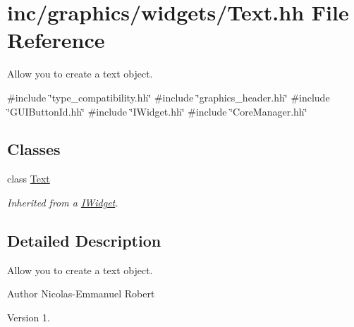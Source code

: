 \hypertarget{Text_8hh}{}\section{inc/graphics/widgets/\+Text.hh File Reference}
\label{Text_8hh}


Allow you to create a text object.  


{\ttfamily \#include \char`\"{}type\+\_\+compatibility.\+hh\char`\"{}}\newline
{\ttfamily \#include \char`\"{}graphics\+\_\+header.\+hh\char`\"{}}\newline
{\ttfamily \#include \char`\"{}G\+U\+I\+Button\+Id.\+hh\char`\"{}}\newline
{\ttfamily \#include \char`\"{}I\+Widget.\+hh\char`\"{}}\newline
{\ttfamily \#include \char`\"{}Core\+Manager.\+hh\char`\"{}}\newline
\subsection*{Classes}
\begin{DoxyCompactItemize}
\item 
class \hyperlink{classText}{Text}
\begin{DoxyCompactList}\small\item\em Inherited from a \hyperlink{classIWidget}{I\+Widget}. \end{DoxyCompactList}\end{DoxyCompactItemize}


\subsection{Detailed Description}
Allow you to create a text object. 

\begin{DoxyAuthor}{Author}
Nicolas-\/\+Emmanuel Robert 
\end{DoxyAuthor}
\begin{DoxyVersion}{Version}
1. 
\end{DoxyVersion}
